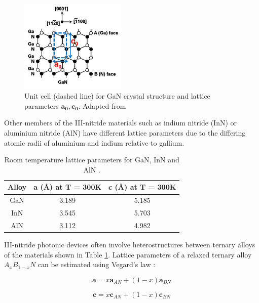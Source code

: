 \begin{figure}[h]
	\centering
	\includegraphics[width=0.45\textwidth]{Figs/Ch1/unit_cell.png}
	\caption {Unit cell (dashed line) for GaN crystal structure and lattice parameters $\mathbf{a_{0}},\mathbf{c_{0}}$. Adapted from \cite{Yu1999}}
	\label{1.2}
\end{figure}
\FloatBarrier

Other members of the III-nitride materials such as indium nitride  (InN) or aluminium nitride  (AlN) have different lattice parameters due to the differing atomic radii of aluminium and indium relative to gallium.

\begin{table}[!htb]
	\centering
	
	\begin{tabular}{ccc}
		Alloy & \textbf{a} (\si{\angstrom}) at T = 300K & \textbf{c} (\si{\angstrom}) at T = 300K \\
		\hline\hline
		GaN   & 3.189   & 5.185   \\
		InN   & 3.545   & 5.703   \\
		AlN   & 3.112  & 4.982  \\ 
		\hline
	\end{tabular}
	\caption{Room temperature lattice parameters for GaN, InN and AlN \cite{Vurgaftman2003}.}
	\label{lattice-param}
\end{table}

III-nitride photonic devices often involve heterostructures between ternary alloys of the materials shown in Table \ref{lattice-param}. Lattice parameters of a relaxed ternary alloy $A_{x}B_{1-x}N$ can be estimated using Vegard's law \cite{Vickers2003}:

\begin{equation}
\mathbf{a} = x \mathbf{a}_{AN} + (1-x)\mathbf{a}_{BN}
\end{equation}

\begin{equation}
\mathbf{c} = x \mathbf{c}_{AN} + (1-x)\mathbf{c}_{BN}
\end{equation}

